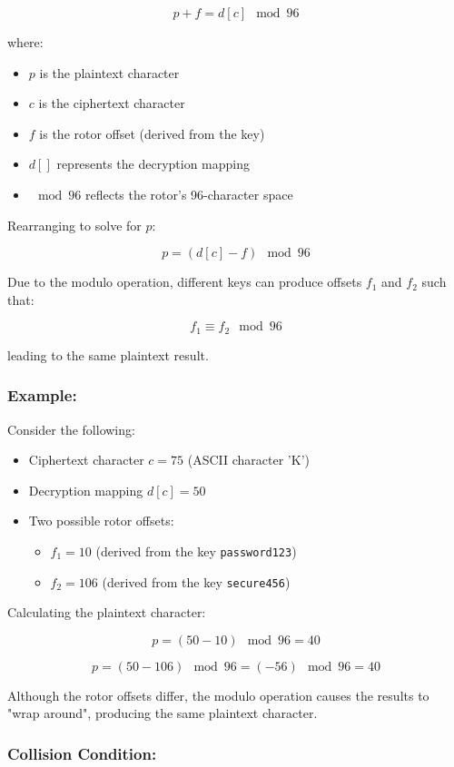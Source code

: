 \documentclass{article}
\begin{document}
\[
p + f = d[c] \mod 96
\]

where:
\begin{itemize}
    \item \( p \) is the plaintext character
    \item \( c \) is the ciphertext character
    \item \( f \) is the rotor offset (derived from the key)
    \item \( d[] \) represents the decryption mapping
    \item \( \mod 96 \) reflects the rotor's 96-character space
\end{itemize}

Rearranging to solve for \( p \):

\[
p = (d[c] - f) \mod 96
\]

Due to the modulo operation, different keys can produce offsets \( f_1 \) and \( f_2 \) such that:

\[
f_1 \equiv f_2 \mod 96
\]

leading to the same plaintext result. 

\subsubsection{Example:}

Consider the following:
\begin{itemize}
    \item Ciphertext character \( c = 75 \) (ASCII character 'K')
    \item Decryption mapping \( d[c] = 50 \)
    \item Two possible rotor offsets:
    \begin{itemize}
        \item \( f_1 = 10 \) (derived from the key \texttt{password123})
        \item \( f_2 = 106 \) (derived from the key \texttt{secure456})
    \end{itemize}
\end{itemize}

Calculating the plaintext character:

\[
p = (50 - 10) \mod 96 = 40
\]

\[
p = (50 - 106) \mod 96 = (-56) \mod 96 = 40
\]

Although the rotor offsets differ, the modulo operation causes the results to "wrap around", producing the same plaintext character.

\subsubsection{Collision Condition:}
\end{document}
